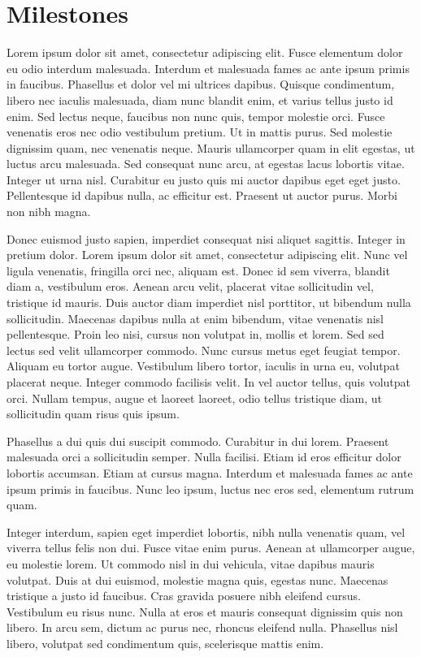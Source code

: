 \documentclass[../proposal.tex]{subfiles}
\begin{document}
\section{Milestones}
Lorem ipsum dolor sit amet, consectetur adipiscing elit. Fusce elementum dolor eu odio interdum malesuada. Interdum et malesuada fames ac ante ipsum primis in faucibus. Phasellus et dolor vel mi ultrices dapibus. Quisque condimentum, libero nec iaculis malesuada, diam nunc blandit enim, et varius tellus justo id enim. Sed lectus neque, faucibus non nunc quis, tempor molestie orci. Fusce venenatis eros nec odio vestibulum pretium. Ut in mattis purus. Sed molestie dignissim quam, nec venenatis neque. Mauris ullamcorper quam in elit egestas, ut luctus arcu malesuada. Sed consequat nunc arcu, at egestas lacus lobortis vitae. Integer ut urna nisl. Curabitur eu justo quis mi auctor dapibus eget eget justo. Pellentesque id dapibus nulla, ac efficitur est. Praesent ut auctor purus. Morbi non nibh magna.

Donec euismod justo sapien, imperdiet consequat nisi aliquet sagittis. Integer in pretium dolor. Lorem ipsum dolor sit amet, consectetur adipiscing elit. Nunc vel ligula venenatis, fringilla orci nec, aliquam est. Donec id sem viverra, blandit diam a, vestibulum eros. Aenean arcu velit, placerat vitae sollicitudin vel, tristique id mauris. Duis auctor diam imperdiet nisl porttitor, ut bibendum nulla sollicitudin. Maecenas dapibus nulla at enim bibendum, vitae venenatis nisl pellentesque. Proin leo nisi, cursus non volutpat in, mollis et lorem. Sed sed lectus sed velit ullamcorper commodo. Nunc cursus metus eget feugiat tempor. Aliquam eu tortor augue. Vestibulum libero tortor, iaculis in urna eu, volutpat placerat neque. Integer commodo facilisis velit. In vel auctor tellus, quis volutpat orci. Nullam tempus, augue et laoreet laoreet, odio tellus tristique diam, ut sollicitudin quam risus quis ipsum.

Phasellus a dui quis dui suscipit commodo. Curabitur in dui lorem. Praesent malesuada orci a sollicitudin semper. Nulla facilisi. Etiam id eros efficitur dolor lobortis accumsan. Etiam at cursus magna. Interdum et malesuada fames ac ante ipsum primis in faucibus. Nunc leo ipsum, luctus nec eros sed, elementum rutrum quam.

Integer interdum, sapien eget imperdiet lobortis, nibh nulla venenatis quam, vel viverra tellus felis non dui. Fusce vitae enim purus. Aenean at ullamcorper augue, eu molestie lorem. Ut commodo nisl in dui vehicula, vitae dapibus mauris volutpat. Duis at dui euismod, molestie magna quis, egestas nunc. Maecenas tristique a justo id faucibus. Cras gravida posuere nibh eleifend cursus. Vestibulum eu risus nunc. Nulla at eros et mauris consequat dignissim quis non libero. In arcu sem, dictum ac purus nec, rhoncus eleifend nulla. Phasellus nisl libero, volutpat sed condimentum quis, scelerisque mattis enim.
\end{document}
